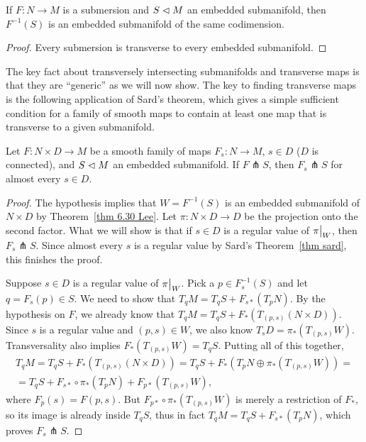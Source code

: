 \begin{cor}
    If $F:N\to M$ is a submersion and $S\vartriangleleft M$ an embedded submanifold, then $F^{-1}(S)$ is an embedded submanifold of the same codimension.
\end{cor}
\begin{proof}
    Every submersion is transverse to every embedded submanifold.
\end{proof}

The key fact about transversely intersecting submanifolds and transverse maps is that they are ``generic'' as we will now show. The key to finding transverse maps is the
following application of Sard's theorem, which gives a simple sufficient condition for
a family of smooth maps to contain at least one map that is transverse to a given submanifold.

\begin{thm}\label{thm 6.35 Lee}
    Let $F:N\times D\to M$ be a smooth family of maps $F_s:N\to M$, $s\in D$ ($D$ is connected), and $S\vartriangleleft M$ an embedded submanifold. If $F \pitchfork S$, then $F_s\pitchfork S$ for almost every $s\in D$.
\end{thm}
\begin{proof}
    The hypothesis implies that $W=F^{-1}(S)$ is an embedded submanifold of $N\times D$ by Theorem~\ref{thm 6.30 Lee}. Let $\pi:N\times D\to D$ be the projection onto the second factor. What we will show is that if $s\in D$ is a regular value of $\restr{\pi}{W}$, then $F_s\pitchfork S$. Since almost every $s$ is a regular value by Sard's Theorem~\ref{thm sard}, this finishes the proof.

    Suppose $s\in D$ is a regular value of $\restr{\pi}{W}$. Pick a $p\in F_s^{-1}(S)$ and let $q=F_s(p)\in S$. We need to show that $T_qM=T_qS+F_{s\ast}(T_pN)$. By the hypothesis on $F$, we already know that $T_qM=T_qS+F_\ast(T_{(p,s)}(N\times D))$. Since $s$ is a regular value and $(p,s)\in W$, we also know $T_sD=\pi_\ast(T_{(p,s)}W)$. Transversality also implies $F_\ast(T_{(p,s)}W)=T_qS$. Putting all of this together,
    \begin{multline}
        T_qM=T_qS+F_\ast(T_{(p,s)}(N\times D))=T_qS+F_\ast(T_pN\oplus \pi_\ast(T_{(p,s)}W))=\\=T_qS+F_{s\ast}\circ\pi_\ast(T_pN)+F_{p\ast}(T_{(p,s)}W),
    \end{multline}
    where $F_p(s)=F(p,s)$. But $F_{p\ast}\circ\pi_\ast(T_{(p,s)}W)$ is merely a restriction of $F_\ast$, so its image is already inside $T_qS$, thus in fact $T_qM=T_qS+F_{s\ast}(T_pN)$, which proves $F_s\pitchfork S$.
\end{proof}



